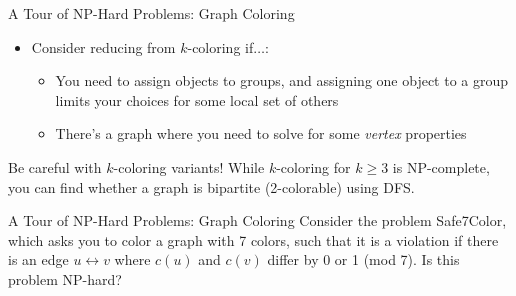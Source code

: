 \documentclass{beamer}
\begin{document}
\begin{frame}[t]{A Tour of NP-Hard Problems: Graph Coloring}
\begin{itemize}
\begin{center}
\begin{overprint}[.2\textwidth]
            \end{overprint}
        \end{center}
        \item \pause \pause Consider reducing from $k$-coloring if$\dotsc$:
        \begin{itemize}
             \item \pause You need to assign objects to groups, and assigning one object to a group limits your choices for some local set of others
             \item \pause There's a graph where you need to solve for some \textit{vertex} properties
        \end{itemize}
        \end{itemize}
        \pause
        \begin{alertblock}{Be careful with $k$-coloring variants!}
            While $k$-coloring for $k \geq 3$ is NP-complete, you can find whether a graph is bipartite (2-colorable) using DFS.
        \end{alertblock}
    
\end{frame}

\begin{frame}[t]{A Tour of NP-Hard Problems: Graph Coloring}
    Consider the problem \alert{Safe7Color}, which asks you to color a graph with 7 colors, such that it is a violation if there is an edge $u \leftrightarrow v$ where $c(u)$ and $c(v)$ differ by 0 or 1 (mod 7). Is this problem NP-hard?
\end{frame}
\end{document}
